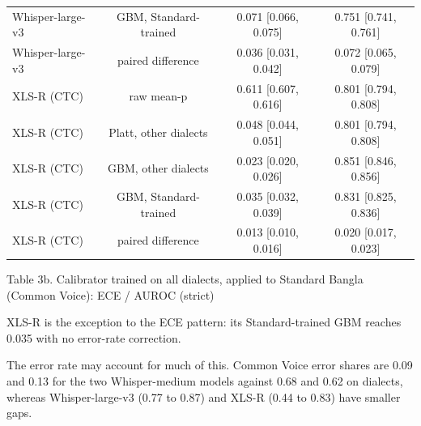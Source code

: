 \documentclass[10pt]{article}
\begin{document}
\begin{table}[htb]
{\begin{tabular}{lccc}
Whisper-large-v3 & GBM, Standard-trained & 0.071 [0.066, 0.075] & 0.751 [0.741, 0.761] \\
Whisper-large-v3 & paired difference & 0.036 [0.031, 0.042] & 0.072 [0.065, 0.079] \\
XLS-R (CTC) & raw mean-p & 0.611 [0.607, 0.616] & 0.801 [0.794, 0.808] \\
XLS-R (CTC) & Platt, other dialects & 0.048 [0.044, 0.051] & 0.801 [0.794, 0.808] \\
XLS-R (CTC) & GBM, other dialects & 0.023 [0.020, 0.026] & 0.851 [0.846, 0.856] \\
XLS-R (CTC) & GBM, Standard-trained & 0.035 [0.032, 0.039] & 0.831 [0.825, 0.836] \\
XLS-R (CTC) & paired difference & 0.013 [0.010, 0.016] & 0.020 [0.017, 0.023] \\
\hline\end{tabular}}
\end{table}


\begin{table}[htb]
\centering
\par\noindent\begin{minipage}{\linewidth}\small Table 3b. Calibrator trained on all dialects, applied to Standard Bangla (Common Voice): ECE / AUROC (strict)\end{minipage}\par\smallskip
\small
{}
\end{table}


XLS-R is the exception to the ECE pattern: its Standard-trained GBM reaches 0.035 with no error-rate correction.


The error rate may account for much of this. Common Voice error shares are 0.09 and 0.13 for the two Whisper-medium models against 0.68 and 0.62 on dialects, whereas Whisper-large-v3 (0.77 to 0.87) and XLS-R (0.44 to 0.83) have smaller gaps.
\end{document}

